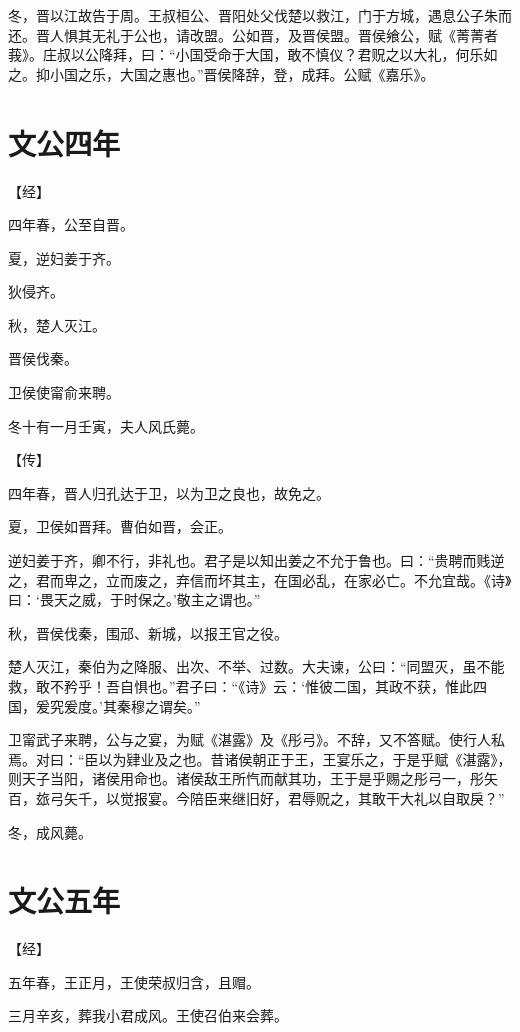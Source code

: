 \documentclass[a4paper,12pt,UTF8,twoside]{ctexbook}
\begin{document}
冬，晋以江故告于周。王叔桓公、晋阳处父伐楚以救江，门于方城，遇息公子朱而还。晋人惧其无礼于公也，请改盟。公如晋，及晋侯盟。晋侯飨公，赋《菁菁者莪》。庄叔以公降拜，曰：“小国受命于大国，敢不慎仪？君贶之以大礼，何乐如之。抑小国之乐，大国之惠也。”晋侯降辞，登，成拜。公赋《嘉乐》。


\chapter{文公四年}


【经】

四年春，公至自晋。

夏，逆妇姜于齐。

狄侵齐。

秋，楚人灭江。

晋侯伐秦。

卫侯使甯俞来聘。

冬十有一月壬寅，夫人风氏薨。

【传】

四年春，晋人归孔达于卫，以为卫之良也，故免之。



夏，卫侯如晋拜。曹伯如晋，会正。

逆妇姜于齐，卿不行，非礼也。君子是以知出姜之不允于鲁也。曰：“贵聘而贱逆之，君而卑之，立而废之，弃信而坏其主，在国必乱，在家必亡。不允宜哉。《诗》曰：‘畏天之威，于时保之。’敬主之谓也。”

秋，晋侯伐秦，围邧、新城，以报王官之役。

楚人灭江，秦伯为之降服、出次、不举、过数。大夫谏，公曰：“同盟灭，虽不能救，敢不矜乎！吾自惧也。”君子曰：“《诗》云：‘惟彼二国，其政不获，惟此四国，爰究爰度。’其秦穆之谓矣。”

卫甯武子来聘，公与之宴，为赋《湛露》及《彤弓》。不辞，又不答赋。使行人私焉。对曰：“臣以为肄业及之也。昔诸侯朝正于王，王宴乐之，于是乎赋《湛露》，则天子当阳，诸侯用命也。诸侯敌王所忾而献其功，王于是乎赐之彤弓一，彤矢百，玈弓矢千，以觉报宴。今陪臣来继旧好，君辱贶之，其敢干大礼以自取戾？”

冬，成风薨。

\chapter{文公五年}



【经】

五年春，王正月，王使荣叔归含，且赗。

三月辛亥，葬我小君成风。王使召伯来会葬。
\end{document}
